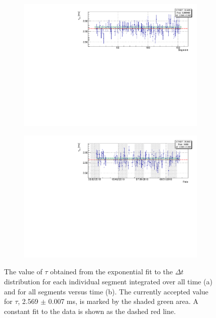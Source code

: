 \begin{figure}[h]
	\begin{subfigure}{1\linewidth}
	\centering
	\includegraphics[width=0.8\linewidth]{tex/6-ac227-images/AD_RateCalc/LifetimePerCell}
	\caption{}
	\label{fig:lifetimepercell}
\end{subfigure}
\begin{subfigure}{1\linewidth}
	\centering
	\includegraphics[width=0.8\linewidth]{tex/6-ac227-images/AD_RateCalc/LifetimeVsTime}
	\caption{}
	\label{fig:lifetimevstime}
\end{subfigure}
\caption{The value of $\tau$ obtained from the exponential fit to the $\Delta t$ distribution for each individual segment integrated over all time (a) and for all segments versus time (b). The currently accepted value for $\tau$, 2.569 $\pm$ 0.007 ms, is marked by the shaded green area. A constant fit to the data is shown as the dashed red line.}
\label{fig:tau}
\end{figure}


